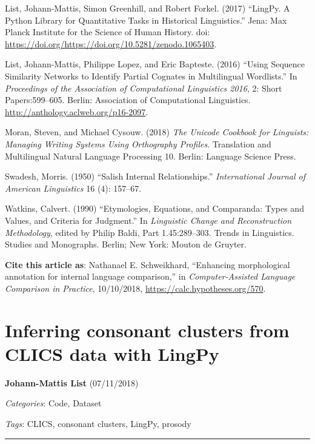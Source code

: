\documentclass[
  english,
  a4paper,
  oneside,tablecaptionabove
]{scrbook}
\begin{document}
List, Johann-Mattis, Simon Greenhill, and Robert Forkel. (2017)
\enquote{LingPy. A Python Library for Quantitative Tasks in Historical
Linguistics.} Jena: Max Planck Institute for the Science of Human
History. doi:
\url{https://doi.org/https://doi.org/10.5281/zenodo.1065403}.

List, Johann-Mattis, Philippe Lopez, and Eric Bapteste. (2016)
\enquote{Using Sequence Similarity Networks to Identify Partial Cognates
in Multilingual Wordlists.} In \emph{Proceedings of the Association of
Computational Linguistics 2016}, 2: Short Papers:599--605. Berlin:
Association of Computational Linguistics.
\url{http://anthology.aclweb.org/p16-2097}.

Moran, Steven, and Michael Cysouw. (2018) \emph{The Unicode Cookbook
for Linguists: Managing Writing Systems Using Orthography Profiles}.
Translation and Multilingual Natural Language Processing 10. Berlin:
Language Science Press.

Swadesh, Morris. (1950) \enquote{Salish Internal Relationships.}
\emph{International Journal of American Linguistics} 16 (4): 157--67.

Watkins, Calvert. (1990) \enquote{Etymologies, Equations, and
Comparanda: Types and Values, and Criteria for Judgment.} In
\emph{Linguistic Change and Reconstruction Methodology}, edited by
Philip Baldi, Part 1.45:289--303. Trends in Linguistics. Studies and
Monographs. Berlin; New York: Mouton de Gruyter.

\textbf{Cite this article as}: Nathanael E. Schweikhard, ``Enhancing
morphological annotation for internal language comparison,'' in
\emph{Computer-Assisted Language Comparison in Practice}, 10/10/2018,
\url{https://calc.hypotheses.org/570}.

\hypertarget{inferring-consonant-clusters-from-clics-data-with-lingpy}{%
\chapter{Inferring consonant clusters from CLICS data with
LingPy}\label{inferring-consonant-clusters-from-clics-data-with-lingpy}}

\textbf{Johann-Mattis List} (07/11/2018)

\emph{Categories}: Code, Dataset

\emph{Tags}: CLICS, consonant clusters, LingPy, prosody

\begin{center}\rule{0.5\linewidth}{\linethickness}\end{center}
\end{document}
